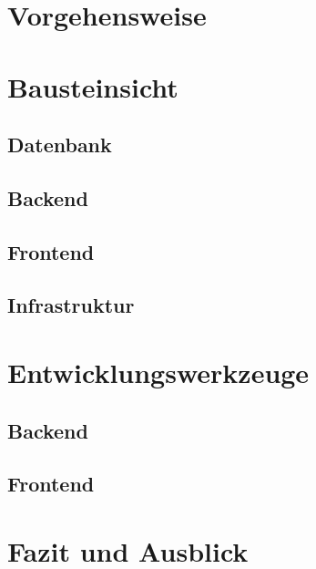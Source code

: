 \documentclass[a4paper, 10pt, conference]{IEEEtran}
\begin{document}
\section{Vorgehensweise}\label{sec:vorgehensweise}



\section{Bausteinsicht}\label{sec:bausteinsicht}



\subsection{Datenbank}\label{subsec:datenbank}



\subsection{Backend}\label{subsec:backend}



\subsection{Frontend}\label{subsec:frontend}



\subsection{Infrastruktur}\label{subsec:infrastruktur}





\section{Entwicklungswerkzeuge}\label{sec:entwicklungswerkzeuge}



\subsection{Backend}\label{subsec:backend-dev-tools}




\subsection{Frontend}\label{subsec:frontend-dev-tools}



\section{Fazit und Ausblick}\label{sec:fazit}




\printbibliography
\end{document}
